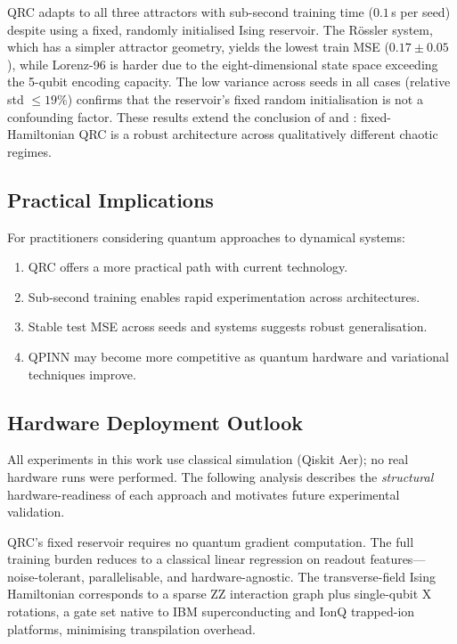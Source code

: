 \documentclass[11pt,a4paper]{article}
\begin{document}
QRC adapts to all three attractors with sub-second training time ($0.1$\,s
per seed) despite using a fixed, randomly initialised Ising reservoir.
The R\"{o}ssler system, which has a simpler attractor geometry, yields the
lowest train MSE ($0.17 \pm 0.05$), while Lorenz-96 is harder due to the
eight-dimensional state space exceeding the 5-qubit encoding capacity.
The low variance across seeds in all cases (relative std $\leq\!19\%$)
confirms that the reservoir's fixed random initialisation is not a
confounding factor.
These results extend the conclusion of \cite{ahmed2025robust} and
\cite{li2025qrc}: fixed-Hamiltonian QRC is a robust architecture across
qualitatively different chaotic regimes.

\subsection{Practical Implications}

For practitioners considering quantum approaches to dynamical systems:
\begin{enumerate}
    \item QRC offers a more practical path with current technology.
    \item Sub-second training enables rapid experimentation across architectures.
    \item Stable test MSE across seeds and systems suggests robust generalisation.
    \item QPINN may become more competitive as quantum hardware and variational techniques improve.
\end{enumerate}

\subsection{Hardware Deployment Outlook}
\label{sec:hardware}

All experiments in this work use classical simulation (Qiskit Aer); no real
hardware runs were performed.
The following analysis describes the \emph{structural} hardware-readiness of
each approach and motivates future experimental validation.

QRC's fixed reservoir requires no quantum gradient computation.
The full training burden reduces to a classical linear regression on readout
features---noise-tolerant, parallelisable, and hardware-agnostic.
The transverse-field Ising Hamiltonian corresponds to a sparse ZZ interaction
graph plus single-qubit X rotations, a gate set native to IBM superconducting
and IonQ trapped-ion platforms, minimising transpilation overhead.
\end{document}
